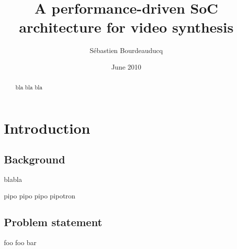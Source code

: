 \documentclass[a4paper,11pt]{kthesis}
\title{A performance-driven SoC architecture for video synthesis}
\date{June 2010}
\author{S\'ebastien Bourdeauducq}
\begin{document}
\begin{abstract}
bla bla bla
\end{abstract}

\tableofcontents

\mainmatter 

\chapter{Introduction}
\section{Background}
blabla

pipo pipo pipo pipotron\cite{milkymist}

\section{Problem statement}
foo foo bar

{}

\end{document}
